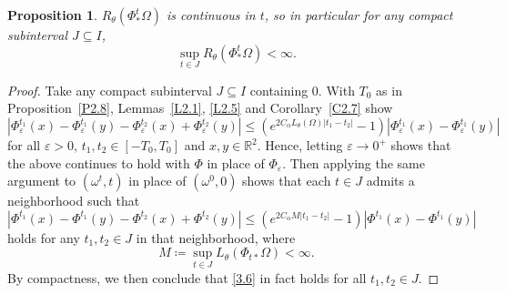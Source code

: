 \documentclass[reqno,centertags,12pt]{amsart}
\newtheorem{proposition}[theorem]{Proposition}
\theoremstyle{definition}
\numberwithin{equation}{section}
\newcommand{\abs}[1]{\left\lvert#1\right\rvert}
\newcommand{\bbR}{{\mathbb{R}}}
\newcommand{\eps}{\varepsilon}
\newcommand{\tht}{\theta}
\begin{document}
\begin{proposition}\label{P3.3}
    $R_{\tht}(\Phi_{*}^{t}\Omega)$ is continuous in $t$, so in particular
    for any compact subinterval $J\subseteq I$,
    \[
        \sup_{t\in J}R_{\tht}(\Phi_{*}^{t}\Omega) < \infty.
    \]
\end{proposition}

\begin{proof}
    Take any compact subinterval $J\subseteq I$ containing $0$.
    With $T_{0}$ as in Proposition~\ref{P2.8},
    Lemmas~\ref{L2.1}, \ref{L2.5} and Corollary~\ref{C2.7} show
    \begin{equation}\label{3.5}
        \abs{\Phi_{\eps}^{t_{1}}(x) - \Phi_{\eps}^{t_{1}}(y)
        - \Phi_{\eps}^{t_{2}}(x) + \Phi_{\eps}^{t_{2}}(y)}
        \leq (e^{2C_{\alpha}L_{\tht}(\Omega)\abs{t_{1}-t_{2}}} - 1)
        \abs{\Phi_{\eps}^{t_{1}}(x) - \Phi_{\eps}^{t_{1}}(y)}
    \end{equation}
    for all $\eps>0$, $t_{1},t_{2}\in[-T_{0},T_{0}]$ and $x,y\in\bbR^{2}$.
    Hence, letting $\eps\to 0^{+}$ shows that the above continues to hold
    with $\Phi$ in place of $\Phi_{\eps}$. Then applying the same argument
    to $(\omega^{t},t)$ in place of $(\omega^{0},0)$ shows that
    each $t\in J$ admits a neighborhood such that
    \begin{equation}\label{3.6}
        \abs{\Phi^{t_{1}}(x) - \Phi^{t_{1}}(y)
        - \Phi^{t_{2}}(x) + \Phi^{t_{2}}(y)}
        \leq (e^{2C_{\alpha}M\abs{t_{1}-t_{2}}} - 1)
        \abs{\Phi^{t_{1}}(x) - \Phi^{t_{1}}(y)}
    \end{equation}
    holds for any $t_{1},t_{2}\in J$ in that neighborhood, where
    \[
        M\coloneqq \sup_{t\in J}L_{\tht}(\Phi_{t*}\Omega) < \infty.
    \]
    By compactness, we then conclude that \eqref{3.6} in fact holds for
    all $t_{1},t_{2}\in J$.


\end{proof}
\end{document}
